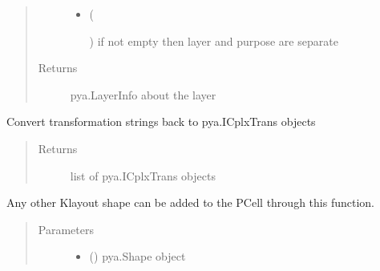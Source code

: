 \documentclass[a4paper,10pt,english]{sphinxmanual}
\begin{document}
\begin{fulllineitems}
\begin{fulllineitems}
\begin{quote}
\begin{description}
\begin{itemize}
\item {} 
 (%
\begin{footnote}[59]\sphinxAtStartFootnote
{}
%
\end{footnote}) \textendash{} if not empty then layer and purpose are separate

\end{itemize}

\item[{Returns}] \leavevmode
pya.LayerInfo about the layer

\end{description}\end{quote}

\end{fulllineitems}


\begin{fulllineitems}
\label{\detokenize{photonics/photonics:kppc.photonics.PhotDevice.get_transformations}}
Convert transformation strings back to pya.ICplxTrans objects
\begin{quote}\begin{description}
\item[{Returns}] \leavevmode
list of pya.ICplxTrans objects

\end{description}\end{quote}

\end{fulllineitems}


\begin{fulllineitems}
\label{\detokenize{photonics/photonics:kppc.photonics.PhotDevice.insert_shape}}
Any other Klayout shape can be added to the PCell through this function.
\begin{quote}\begin{description}
\item[{Parameters}] \leavevmode\begin{itemize}
\item {} 
 () \textendash{} pya.Shape object


\end{itemize}
\end{description}
\end{quote}
\end{fulllineitems}
\end{fulllineitems}
\end{document}
